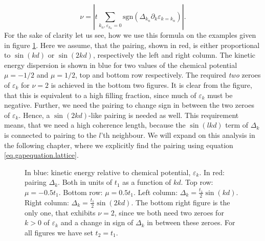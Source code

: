 \begin{equation}
\nu = \left|t\sum_{k_n, \varepsilon_{k_n} = 0} \text{sgn}\left(\Delta_{k_n}\partial_k\varepsilon_{k = k_n}\right)\right|.
\label{eq.topologicalinvariant}
\end{equation} 
For the sake of clarity let us see, how we use this formula on the examples given in figure \ref{fig.dispersions.lattice}. Here we assume, that the pairing, shown in red, is either proportional to $\sin(kd)$ or $\sin(2kd)$, respectively the left and right column. The kinetic energy dispersion is shown in blue for two values of the chemical potential $\mu = -1/2$ and $\mu = 1/2$, top and bottom row respectively. The required \textit{two} zeroes of $\varepsilon_k$ for $\nu = 2$ is achieved in the bottom two figures. It is clear from the figure, that this is equivalent to a high filling fraction, since much of $\varepsilon_k$ must be negative. Further, we need the pairing to change sign in between the two zeroes of $\varepsilon_k$. Hence, a $\sin(2kd)$-like pairing is needed as well. This requirement means, that we need a high coherence length, because the $\sin(lkd)$ term of $\Delta_k$ is connected to pairing to the $l$'th neighbour. We will expand on this analysis in the following chapter, where we explicitly find the pairing using equation \eqref{eq.gapequation.lattice}.

\begin{figure}
\begin{center}

\caption{In blue: kinetic energy relative to chemical potential, $\varepsilon_k$. In red: pairing $\Delta_k$. Both in units of $t_1$ as a function of $kd$. Top row: $\mu = -0.5 t_1$. Bottom row: $\mu = 0.5 t_1$. Left column: $\Delta_k = \frac{t_1}{2}\sin(kd)$. Right column: $\Delta_k = \frac{t_1}{2}\sin(2kd)$. The bottom right figure is the only one, that exhibits $\nu = 2$, since we both need two zeroes for $k >0$ of $\varepsilon_k$ and a change in sign of $\Delta_k$ in between these zeroes. For all figures we have set $t_2 = t_1$. }
\label{fig.dispersions.lattice}
\end{center}
\end{figure}





